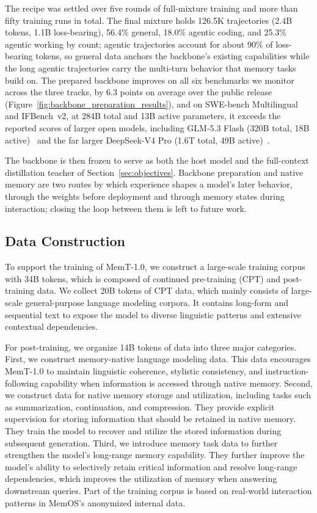 The recipe was settled over five rounds of full-mixture training and more than fifty training runs in total. The final mixture holds 126.5K trajectories (2.4B tokens, 1.1B loss-bearing), 56.4\% general, 18.0\% agentic coding, and 25.3\% agentic working by count; agentic trajectories account for about 90\% of loss-bearing tokens, so general data anchors the backbone's existing capabilities while the long agentic trajectories carry the multi-turn behavior that memory tasks build on. The prepared backbone improves on all six benchmarks we monitor across the three tracks, by 6.3 points on average over the public release (Figure~\ref{fig:backbone_preparation_results}), and on SWE-bench Multilingual and IFBench~v2, at 284B total and 13B active parameters, it exceeds the reported scores of larger open models, including GLM-5.3 Flash (320B total, 18B active)~\cite{glm53flash} and the far larger DeepSeek-V4 Pro (1.6T total, 49B active)~\cite{deepseekai2026deepseekv4}.

The backbone is then frozen to serve as both the host model and the full-context distillation teacher of Section~\ref{sec:objectives}. Backbone preparation and native memory are two routes by which experience shapes a model's later behavior, through the weights before deployment and through memory states during interaction; closing the loop between them is left to future work.

\subsection{Data Construction}

To support the training of MemT-1.0, we construct a large-scale training corpus with 34B tokens, which is composed of continued pre-training (CPT) and post-training data.
We collect 20B tokens of CPT data, which mainly consists of large-scale general-purpose language modeling corpora.
It contains long-form and sequential text to expose the model to diverse linguistic patterns and extensive contextual dependencies.

For post-training, we organize 14B tokens of data into three major categories.
First, we construct memory-native language modeling data.
This data encourages MemT-1.0 to maintain linguistic coherence, stylistic consistency, and instruction-following capability when information is accessed through native memory.
Second, we construct data for native memory storage and utilization, including tasks such as summarization, continuation, and compression.
They provide explicit supervision for storing information that should be retained in native memory.
They train the model to recover and utilize the stored information during subsequent generation.
Third, we introduce memory task data to further strengthen the model's long-range memory capability.
They further improve the model's ability to selectively retain critical information and resolve long-range dependencies, which improves the utilization of memory when answering downstream queries.
Part of the training corpus is based on real-world interaction patterns in MemOS's anonymized internal data.

